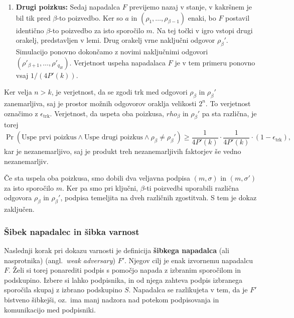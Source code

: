 \begin{dokaz}
\begin{enumerate}
        \item \textbf{Drugi poizkus:} Sedaj napadalca $F$ previjemo nazaj v stanje, v kakršnem je bil
            tik pred $\beta$-to poizvedbo. Ker so $a$ in $(\rho_1, \dots, \rho_{\beta-1})$ enaki, bo
            $F$ postavil identično $\beta$-to poizvedbo za isto sporočilo $m$. Na tej točki v igro
            vstopi drugi orakelj, predstavljen v lemi. Drug orakelj vrne naključni odgovor
            $\rho_\beta'$. Simulacijo ponovno dokončamo z novimi naključnimi odgovori
            $(\rho'_{\beta+1}, \dots, \rho'_{q_H})$. Verjetnost uspeha napadalaca $F$ je v tem primeru ponovno
            vsaj $1/(4P'(k))$.
    \end{enumerate}

    Ker velja $n > k$, je verjetnost, da se zgodi trk med odgovori $\rho_\beta$ in $\rho_\beta'$
    zanemarljiva, saj je prostor možnih odgovorov oraklja velikosti $2^n$. To verjetnost označimo
    z $\epsilon_{\text{trk}}$. Verjetnost, da uspeta oba poizkusa, $rho_\beta$ in $\rho_\beta'$ pa
    sta različna, je torej
    $$
    \Pr(\text{Uspe prvi poizkus} \wedge \text{Uspe drugi poizkus} \wedge \rho_\beta \neq \rho_\beta') \geq
    \frac{1}{4P'(k)} \cdot \frac{1}{4P'(k)} \cdot (1 - \epsilon_{\text{trk}}),
    $$
    kar je nezanemarljivo, saj je produkt treh nezanemarljivih faktorjev še vedno nezanemarljiv.

    Če sta uspela oba poizkusa, smo dobili dva veljavna podpisa $(m, \sigma)$ in
    $(m, \sigma')$ za isto sporočilo $m$. Ker pa smo pri ključni, $\beta$-ti poizvedbi
    uporabili različna odgovora $\rho_\beta$ in $\rho_\beta'$, podpisa temeljita na dveh
    različnih zgostitvah. S tem je dokaz zaključen.
\end{dokaz}

\subsubsection{Šibek napadalec in šibka varnost}
Naslednji korak pri dokazu varnosti je definicija \textbf{šibkega napadalca} (ali nasprotnika) (angl.\
\textit{weak adversary}) $F'$. Njegov cilj je enak izvornemu napadalcu $F$. Želi si torej ponarediti podpis
s pomočjo napada z izbranim sporočilom in podskupino. Izbere si lahko podpisnika, in od njega
zahteva podpis izbranega sporočila skupaj z izbrano podskupino $S$. Napadalca se razlikujeta v tem,
da je $F'$ bistveno šibkejši, oz.\ ima manj nadzora nad potekom podpisovanja in komunikacijo med
podpisniki.


